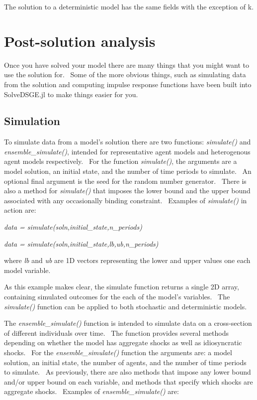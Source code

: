 \documentclass[notitlepage,11pt]{article}
\begin{document}
The solution to a deterministic model has the same fields with the exception
of k.

\section{Post-solution analysis}

Once you have solved your model there are many things that you might want to
use the solution for. \ Some of the more obvious things, such as simulating
data from the solution and computing impulse response functions have been
built into SolveDSGE.jl to make things easier for you.

\subsection{Simulation}

To simulate data from a model's solution there are two functions: \textit{%
simulate()} and \textit{ensemble\_simulate()}, intended for representative
agent models and heterogenous agent models respectively. \ For the function 
\textit{simulate()}, the arguments are a model solution, an initial state,
and the number of time periods to simulate. \ An optional final argument is
the seed for the random number generator. \ There is also a method for 
\textit{simulate()} that imposes the lower bound and the upper bound
associated with any occasionally binding constraint. \ Examples of \textit{%
simulate()} in action are:

\bigskip

\textit{data = simulate(soln,initial\_state,n\_periods)}

\textit{data = simulate(soln,initial\_state,lb,ub,n\_periods)}

\bigskip

where \textit{lb} and \textit{ub} are 1D vectors representing the lower and
upper values one each model variable.

\bigskip

As this example makes clear, the simulate function returns a single 2D
array, containing simulated outcomes for the each of the model's variables.
\ The \textit{simulate()} function can be applied to both stochastic and
deterministic models.

The \textit{ensemble\_simulate()} function is intended to simulate data on a
cross-section of different individuals over time. \ The function provides
several methods depending on whether the model has aggregate shocks as well
as idiosyncratic shocks. \ For the \textit{ensemble\_simulate()} function
the arguments are: a model solution, an initial state, the number of agents,
and the number of time periods to simulate. \ As previously, there are also
methods that impose any lower bound and/or upper bound on each variable, and
methods that specify which shocks are aggregate shocks. \ Examples of 
\textit{ensemble\_simulate()} are:
\end{document}
